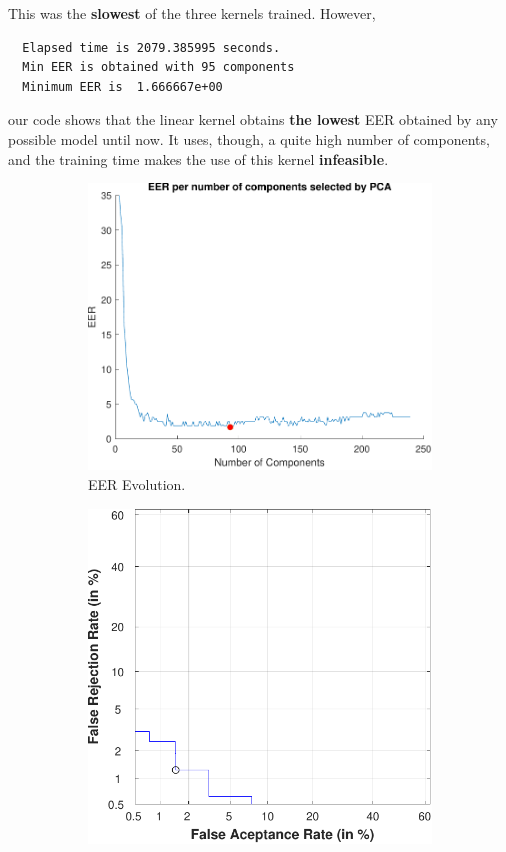 \documentclass[a4paper]{article}
\begin{document}
\begin{enumerate}
This was the \textbf{slowest} of the three kernels trained. However,
\begin{verbatim}
  Elapsed time is 2079.385995 seconds.
  Min EER is obtained with 95 components
  Minimum EER is  1.666667e+00 
\end{verbatim}
our code shows that the linear kernel obtains \textbf{the lowest} EER obtained by any possible model until now. It uses, though, a quite high number of components, and the training time makes the use of this kernel \textbf{infeasible}.
\begin{figure}[H]
  \centering
       \begin{subfigure}[t]{0.45\textwidth}
         \centering
         \includegraphics[scale=0.5]{Figures/SVM-Linear-1TOMAX}
         \caption{EER Evolution.}
     \end{subfigure}%
     \quad
     \begin{subfigure}[t]{0.45\textwidth}
         \centering
         \includegraphics[scale=0.5]{Figures/SVM-linear-OPTIMPCA}

\end{subfigure}
\end{figure}
\end{enumerate}
\end{document}
